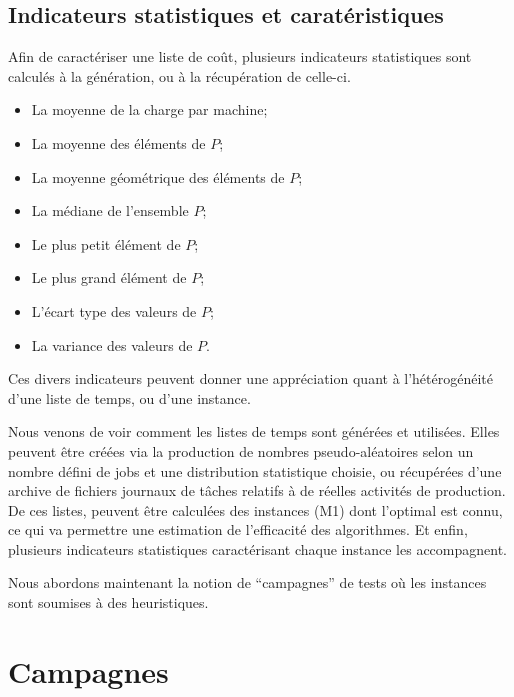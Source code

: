 \documentclass[a4paper,12pt]{report}
\theoremstyle{plain}				%
\theoremstyle{definition}				%
\begin{document}
\subsection{Indicateurs statistiques et caratéristiques}\label{ssec:instancesIndicateursStatistiquesCaratéristiques}

Afin de caractériser une liste de coût, plusieurs indicateurs statistiques sont calculés à la génération, ou à la récupération de celle-ci.

\begin{itemize}
	\item La moyenne de la charge par machine;
	\item La moyenne des éléments de $P$;
	\item La moyenne géométrique des éléments de $P$;
	\item La médiane de l'ensemble $P$;
	\item Le plus petit élément de $P$;
	\item Le plus grand élément de $P$;
	\item L'écart type des valeurs de $P$;
	\item La variance des valeurs de $P$.
\end{itemize}

Ces divers indicateurs peuvent donner une appréciation quant à 
  l'hétérogénéité d'une liste de temps, ou d'une instance.


\bigskip
Nous venons de voir comment les listes de temps sont générées et utilisées. 
Elles peuvent être créées via la production de nombres pseudo-aléatoires selon un nombre 
  défini de jobs et une distribution statistique choisie, 
  ou récupérées d'une archive de fichiers journaux de tâches relatifs à de réelles 
  activités de production.
De ces listes, peuvent être calculées des instances (M1) dont l'optimal est connu, 
  ce qui va permettre une estimation de l'efficacité des algorithmes.
Et enfin, plusieurs indicateurs statistiques caractérisant chaque instance les accompagnent.

Nous abordons maintenant la notion de ``campagnes'' de tests où les instances sont soumises à des heuristiques.  

\section{Campagnes} \label{sec:Campagnes}
\end{document}
